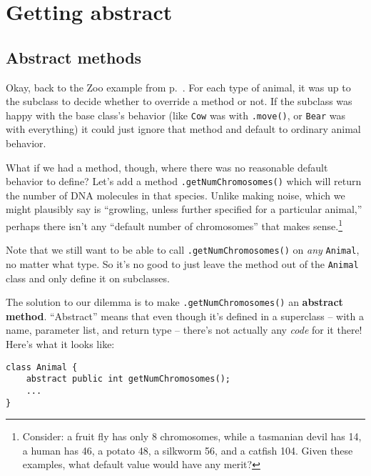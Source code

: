 \section{Getting abstract}

\subsection{Abstract methods}

Okay, back to the Zoo example from p.~\pageref{zooExample}. For each type of
animal, it was up to the subclass to decide whether to override a method or
not. If the subclass was happy with the base class's behavior (like
\texttt{Cow} was with \texttt{.move()}, or \texttt{Bear} was with everything)
it could just ignore that method and default to ordinary animal behavior.

What if we had a method, though, where there was no reasonable default
behavior to define? Let's add a method \texttt{.getNumChromosomes()} which
will return the number of DNA molecules in that species. Unlike making noise,
which we might plausibly say is ``growling, unless further specified for a
particular animal,'' perhaps there isn't any ``default number of chromosomes''
that makes sense.\footnote{Consider: a fruit fly has only 8 chromosomes, while
a tasmanian devil has 14, a human has 46, a potato 48, a silkworm 56, and a
catfish 104. Given these examples, what default value would have any merit?}

Note that we still want to be able to call \texttt{.getNumChromosomes()} on
\textit{any} \texttt{Animal}, no matter what type. So it's no good to just
leave the method out of the \texttt{Animal} class and only define it on
subclasses.

\begin{samepage}
The solution to our dilemma is to make \texttt{.getNumChromosomes()} an
\textbf{abstract method}. ``Abstract'' means that even though it's defined in a
superclass -- with a name, parameter list, and return type -- there's not
actually any \textit{code} for it there! Here's what it looks like:

\begin{Verbatim}[fontsize=\small,samepage=true,frame=single]
class Animal {
    abstract public int getNumChromosomes();
    ...
}
\end{Verbatim}
\end{samepage}

